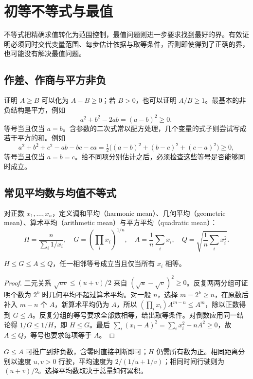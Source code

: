 \setcounter{chapter}{9} %
\chapter{初等不等式与最值}
\label{chap:em-inequality-methods}
不等式把精确求值转化为范围控制，最值问题则进一步要求找到最好的界。有效证明必须同时交代变量范围、每步估计依据与取等条件，否则即使得到了正确的界，也可能没有解决最值问题。

\section{作差、作商与平方非负}
证明 $A\ge B$ 可以化为 $A-B\ge0$；若 $B>0$，也可以证明 $A/B\ge1$。最基本的非负结构是平方，例如
\[
 a^2+b^2-2ab=(a-b)^2\ge0,
\]
等号当且仅当 $a=b$。含参数的二次式常以配方处理，几个变量的式子则尝试写成若干平方的和。例如
\[
 a^2+b^2+c^2-ab-bc-ca
 =\tfrac12\bigl((a-b)^2+(b-c)^2+(c-a)^2\bigr)\ge0,
\]
等号当且仅当 $a=b=c$。给不同项分别估计之后，必须检查这些等号是否能够同时成立。

\section{常见平均数与均值不等式}
对正数 $x_1,\ldots,x_n$，定义调和平均（harmonic mean）、几何平均（geometric mean）、算术平均（arithmetic mean）与平方平均（quadratic mean）：
\[
 H=\frac n{\sum_i1/x_i},\quad G=\left(\prod_i x_i\right)^{1/n},
 \quad A=\frac1n\sum_i x_i,\quad Q=\sqrt{\frac1n\sum_i x_i^2}.
\]
\begin{theorem}[均值链]
$H\le G\le A\le Q$，任一相邻等号成立当且仅当所有 $x_i$ 相等。
\end{theorem}
\begin{proof}
二元关系 $\sqrt{uv}\le(u+v)/2$ 来自 $(\sqrt u-\sqrt v)^2\ge0$。反复两两分组可证明个数为 $2^k$ 时几何平均不超过算术平均。对一般 $n$，选择 $m=2^k\ge n$，在原数后补入 $m-n$ 个 $A$，新算术平均仍为 $A$，所以 $(\prod_i x_i)A^{m-n}\le A^m$，除以正数得到 $G\le A$。反复分组的等号要求全部数相等，给出取等条件。对倒数应用同一结论得 $1/G\le1/H$，即 $H\le G$。最后 $\sum_i(x_i-A)^2=\sum_i x_i^2-nA^2\ge0$，故 $A\le Q$，等号也要求每项等于 $A$。
\end{proof}
$G\le A$ 可推广到非负数，含零时直接判断即可；$H$ 仍需所有数为正。相同距离分别以速度 $u,v>0$ 行驶，平均速度为 $2/(1/u+1/v)$；相同时间行驶则为 $(u+v)/2$。选择平均数取决于总量如何累积。

